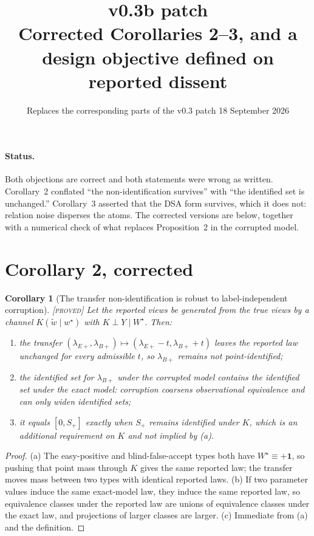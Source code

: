 \documentclass[11pt]{article}
\title{\textbf{v0.3b patch}\\[2pt]
\large Corrected Corollaries 2--3, and a design objective defined on reported dissent}
\author{Replaces the corresponding parts of the v0.3 patch \textperiodcentered{} 18 September 2026}
\date{}
\newtheorem{corollary}{Corollary}
\theoremstyle{remark}
\newcommand{\status}[1]{\hfill{\normalfont\small\textsc{[#1]}}}
\newcommand{\one}{\mathbf{1}}
\begin{document}
\maketitle
\vspace{-2.5em}

\paragraph{Status.} Both objections are correct and both statements were wrong as written. Corollary~2 conflated ``the non-identification survives'' with ``the identified set is unchanged.'' Corollary~3 asserted that the DSA form survives, which it does not: relation noise disperses the atoms. The corrected versions are below, together with a numerical check of what replaces Proposition~2 in the corrupted model.

\section*{Corollary 2, corrected}

\begin{corollary}[The transfer non-identification is robust to label-independent corruption]\status{proved}
Let the reported views be generated from the true views by a channel $K(\widetilde w\mid w^\star)$ with $K\perp Y\mid W^\star$. Then:
\begin{enumerate}
\item[(a)] the transfer $(\lambda_{E+},\lambda_{B+})\mapsto(\lambda_{E+}-t,\lambda_{B+}+t)$ leaves the reported law unchanged for every admissible $t$, so $\lambda_{B+}$ remains not point-identified;
\item[(b)] the identified set for $\lambda_{B+}$ under the corrupted model contains the identified set under the exact model: corruption coarsens observational equivalence and can only widen identified sets;
\item[(c)] it equals $[0,S_+]$ exactly when $S_+$ remains identified under $K$, which is an additional requirement on $K$ and not implied by (a).
\end{enumerate}
\end{corollary}
\begin{proof}
(a) The easy-positive and blind-false-accept types both have $W^\star\equiv+\one$, so pushing that point mass through $K$ gives the same reported law; the transfer moves mass between two types with identical reported laws. (b) If two parameter values induce the same exact-model law, they induce the same reported law, so equivalence classes under the reported law are unions of equivalence classes under the exact law, and projections of larger classes are larger. (c) Immediate from (a) and the definition.
\end{proof}
\end{document}

